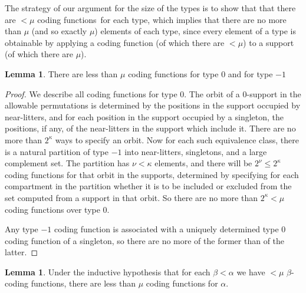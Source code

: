 \documentclass[112pt]{article}
\theoremstyle{definition}
\newtheorem{lemma}[theorem]{Lemma}
\theoremstyle{remark}
\begin{document}
The strategy of our argument for the size of the types is to show that that there are $<\mu$ coding functions\ for each type, which implies that there are no more than $\mu$ (and so exactly $\mu$) elements of each type, since every element of a type is obtainable by applying a coding function (of which there are $<\mu$) to a support (of which there are $\mu$).

\begin{lemma}\label{lem:count_coding_function_zero}
{There are less than $\mu$ coding functions for type 0 and for type $-1$}
\end{lemma}
\begin{proof}
We describe all coding functions for type 0.  The orbit of a 0-support in the allowable permutations is determined by the positions in the support  occupied by near-litters, and for each position in the support occupied by a singleton, the positions, if any, of the near-litters in the support  which include it.  
  There are no more than $2^\kappa$ ways to specify an orbit.  Now for each such equivalence class, there is a natural partition of type $-1$ into near-litters, singletons, and a large complement set.  The partition has $\nu<\kappa$ elements, and there will be $2^\nu\leq 2^\kappa$ coding functions for that orbit in the supports, determined by specifying for each compartment in the partition whether it is to be included or excluded from the set computed from a support in that orbit.  So there are no more than $2^\kappa<\mu$ coding functions over type 0.

Any type $-1$ coding function is associated with a uniquely determined type 0 coding function of a singleton, so there are no more of the former than of the latter.

\end{proof}

\begin{lemma}\label{lem:count_coding_function}
{Under the inductive hypothesis that for each $\beta<\alpha$ we have $<\mu$ $\beta$-coding functions, there are less than $\mu$ coding functions for $\alpha$.}
\end{lemma}
\end{document}
